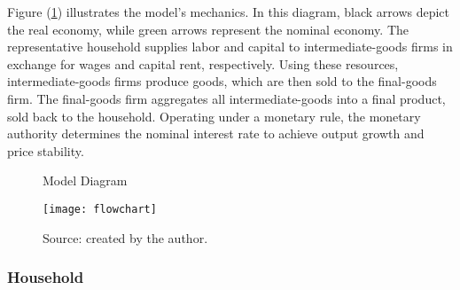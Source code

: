 \documentclass[../thesis.tex]{subfiles}
\begin{document}




Figure (\ref{fig_v6:model-diagram}) illustrates the model's mechanics. In this diagram, black arrows depict the real economy, while green arrows represent the nominal economy. The representative household supplies labor and capital to intermediate-goods firms in exchange for wages and capital rent, respectively. Using these resources, intermediate-goods firms produce goods, which are then sold to the final-goods firm. The final-goods firm aggregates all intermediate-goods into a final product, sold back to the household. Operating under a monetary rule, the monetary authority determines the nominal interest rate to achieve output growth and price stability.

\begin{figure}[h]
	\centering
	\caption{Model Diagram}
	\texttt{[image: flowchart]}
	\caption*{Source: created by the author.}
	\label{fig_v6:model-diagram}
\end{figure}	
	



\subsubsection{Household}
\end{document}
